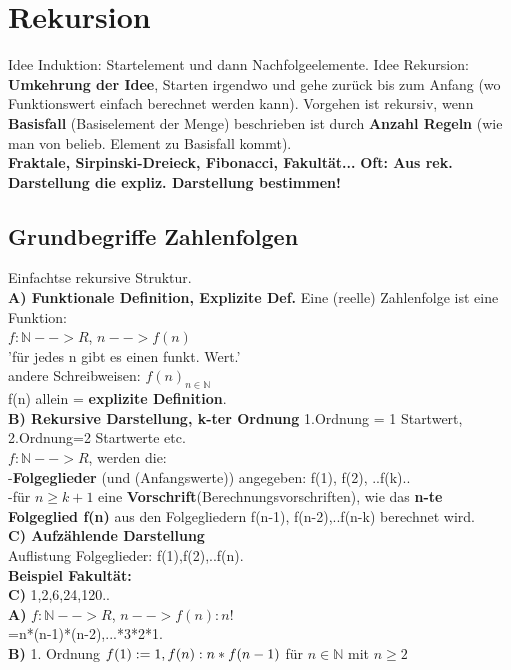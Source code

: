 \section{Rekursion}
Idee Induktion: Startelement und dann Nachfolgeelemente. Idee Rekursion: \textbf{Umkehrung der Idee}, Starten irgendwo und gehe zurück bis zum Anfang (wo Funktionswert einfach berechnet werden kann).
Vorgehen ist rekursiv, wenn \textbf{Basisfall} (Basiselement der Menge) beschrieben ist durch \textbf{Anzahl Regeln} (wie man von belieb. Element zu Basisfall kommt).\\
\textbf{Fraktale, Sirpinski-Dreieck, Fibonacci, Fakultät...}
\textbf{Oft: Aus rek. Darstellung die expliz. Darstellung bestimmen!}\\

\subsection{Grundbegriffe Zahlenfolgen}
Einfachtse rekursive Struktur.\\
\textbf{A) Funktionale Definition, Explizite Def.}
Eine (reelle) Zahlenfolge ist eine Funktion: \\
$f:\mathbb{N}-->R$, $n -->f(n)$\\
'für jedes n gibt es einen funkt. Wert.'\\
andere Schreibweisen: $f(n)_{n \in \mathbb{N}}$\\
f(n) allein = \textbf{explizite Definition}.\\
\textbf{B) Rekursive Darstellung, k-ter Ordnung}
1.Ordnung = 1 Startwert, 2.Ordnung=2 Startwerte etc.\\
$f:\mathbb{N}-->R$, werden die:\\
-\textbf{Folgeglieder} (und {(Anfangswerte)}) angegeben: f(1), f(2), ..f(k)..\\
-für $n \ge k+1$ eine \textbf{Vorschrift}(Berechnungsvorschriften), wie das \textbf{n-te Folgeglied f(n)} aus den Folgegliedern f(n-1), f(n-2),..f(n-k) berechnet wird.\\
\textbf{C) Aufzählende Darstellung}\\
Auflistung Folgeglieder: f(1),f(2),..f(n).\\

\textbf{Beispiel Fakultät:}\\
\textbf{C)} 1,2,6,24,120..\\
\textbf{A)} $f:\mathbb{N}-->R$, $n -->f(n): n!$\\
=n*(n-1)*(n-2),...*3*2*1.\\
\textbf{B)} 1. Ordnung $f(1):=1, \\ 
f(n):n*f(n-1)$ für $n \in \mathbb{N}$ mit $n\ge2$\\

